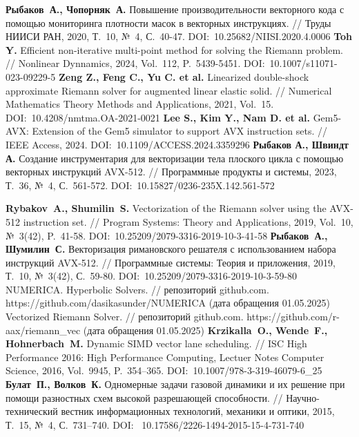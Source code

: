\begin{thebibliography}{99}
%
\textbf{Рыбаков~А., Чопорняк~А.} Повышение производительности векторного кода с помощью мониторинга плотности масок в векторных инструкциях. // Труды НИИСИ РАН, 2020, Т.~10, №~4, С.~40-47. DOI:~10.25682/NIISI.2020.4.0006
%
\textbf{Toh Y.} Efficient non-iterative multi-point method for solving the Riemann problem. // Nonlinear Dynnamics, 2024, Vol.~112, P.~5439-5451. DOI:~10.1007/s11071-023-09229-5
%
\textbf{Zeng Z., Feng C., Yu C. et al.} Linearized double-shock approximate Riemann solver for augmented linear elastic solid. // Numerical Mathematics Theory Methods and Applications, 2021, Vol.~15. DOI:~10.4208/nmtma.OA-2021-0021
%
\textbf{Lee S., Kim Y., Nam D. et al.} Gem5-AVX: Extension of the Gem5 simulator to support AVX instruction sets. // IEEE Access, 2024. DOI:~10.1109/ACCESS.2024.3359296
%
\textbf{Рыбаков А., Швиндт А.} Создание инструментария для векторизации тела плоского цикла с помощью векторных инструкций AVX-512. // Программные продукты и системы, 2023, Т.~36, №~4, С.~561-572. DOI:~10.15827/0236-235X.142.561-572
%



%
%



%
%



%
\textbf{Rybakov~A., Shumilin~S.} Vectorization of the Riemann solver using the AVX-512 instruction set. // Program Systems: Theory and Applications, 2019, Vol.~10, №~3(42), P.~41-58. DOI:~10.25209/2079-3316-2019-10-3-41-58
%
\textbf{Рыбаков~А., Шумилин~С.} Векторизация римановского решателя с использованием набора инструкций AVX-512. // Программные системы: Теория и приложения, 2019, Т.~10, №~3(42), С.~59-80. DOI:~10.25209/2079-3316-2019-10-3-59-80
%
NUMERICA. Hyperbolic Solvers. // репозиторий github.com. https://github.com/dasikasunder/NUMERICA (дата обращения 01.05.2025)
%
Vectorized Riemann Solver. // репозиторий github.com. https://github.com/r-aax/riemann\_vec (дата обращения 01.05.2025)
%
\textbf{Krzikalla~O., Wende~F., Hohnerbach~M.} Dynamic SIMD vector lane scheduling. // ISC High Performance 2016: High Performance Computing, Lectuer Notes Computer Science, 2016, Vol.~9945, P.~354–365. DOI:~10.1007/978-3-319-46079-6\_25
%
\textbf{Булат~П., Волков~К.} Одномерные задачи газовой динамики и их решение при помощи разностных схем высокой разрешающей способности. // Научно-технический вестник информационных технологий,
механики и оптики, 2015, Т.~15, №~4, С.~731–740. DOI:~ 10.17586/2226-1494-2015-15-4-731-740
%




\end{thebibliography}
